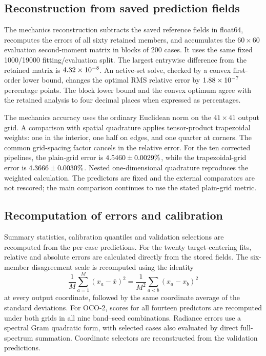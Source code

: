 \subsection{Reconstruction from saved prediction fields}
The mechanics reconstruction subtracts the saved reference fields in
float64, recomputes the errors of all sixty retained members,
and accumulates the $60\times60$ evaluation second-moment matrix in blocks
of 200 cases. It uses the same fixed 1000/19000 fitting/evaluation split.
The largest entrywise difference from the retained matrix is
$4.32\times10^{-8}$. An active-set solve, checked by a convex
first-order lower bound, changes the optimal RMS relative error by
$1.88\times10^{-7}$ percentage points. The block lower bound and the
convex optimum agree with the retained analysis to four decimal places
when expressed as percentages.

The mechanics accuracy uses the ordinary Euclidean norm on the
$41\times41$ output grid. A comparison with spatial quadrature applies tensor-product
trapezoidal weights: one in the interior, one half on edges, and one quarter
at corners. The common grid-spacing factor cancels in the relative error.
For the ten corrected pipelines, the plain-grid error is
$4.5460\pm0.0029\%$, while the trapezoidal-grid error is
$4.3666\pm0.0030\%$. Nested one-dimensional
quadrature reproduces the weighted calculation. The predictors are fixed
and the external comparators are not rescored; the
main comparison continues to use the stated plain-grid metric.

\subsection{Recomputation of errors and calibration}
\label{sec:sensitivity-availability}
Summary statistics, calibration quantiles and validation selections are
recomputed from the per-case predictions. For the twenty target-centering
fits, relative and absolute errors are calculated directly from the
stored fields. The six-member disagreement scale is recomputed using
the identity
\[
 \frac1M\sum_{a=1}^M(x_a-\bar x)^2
 =\frac1{M^2}\sum_{a<b}(x_a-x_b)^2
\]
at every output coordinate, followed by the same coordinate average of
the standard deviations. For OCO-2, scores for all fourteen predictors are recomputed under both
grids in all nine band--seed combinations. Radiance errors use a spectral
Gram quadratic form, with selected cases also evaluated by direct
full-spectrum summation. Coordinate selectors are reconstructed from the
validation predictions.

